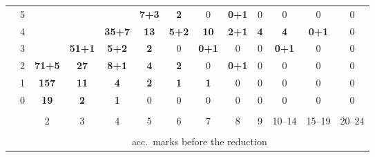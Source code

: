 \begin{tabular}{cc|ccccccccccc|}
 & 
5
 & 
\footnotesize{}
 & 
\footnotesize{}
 & 
\footnotesize{}
 & 
\footnotesize{\cellcolor{blue!8}\textbf{7+3}}
 & 
\footnotesize{\cellcolor{blue!5}\textbf{2}}
 & 
\footnotesize{0}
 & 
\footnotesize{\cellcolor{blue!5}\textbf{0+1}}
 & 
\footnotesize{0}
 & 
\footnotesize{0}
 & 
\footnotesize{0}
 & 
\footnotesize{0}
\\
 & 
4
 & 
\footnotesize{}
 & 
\footnotesize{}
 & 
\footnotesize{\cellcolor{blue!19}\textbf{35+7}}
 & 
\footnotesize{\cellcolor{blue!9}\textbf{13}}
 & 
\footnotesize{\cellcolor{blue!7}\textbf{5+2}}
 & 
\footnotesize{\cellcolor{blue!8}\textbf{10}}
 & 
\footnotesize{\cellcolor{blue!6}\textbf{2+1}}
 & 
\footnotesize{\cellcolor{blue!6}\textbf{4}}
 & 
\footnotesize{\cellcolor{blue!6}\textbf{4}}
 & 
\footnotesize{\cellcolor{blue!5}\textbf{0+1}}
 & 
\footnotesize{0}
\\
 & 
3
 & 
\footnotesize{}
 & 
\footnotesize{\cellcolor{blue!22}\textbf{51+1}}
 & 
\footnotesize{\cellcolor{blue!7}\textbf{5+2}}
 & 
\footnotesize{\cellcolor{blue!5}\textbf{2}}
 & 
\footnotesize{0}
 & 
\footnotesize{\cellcolor{blue!5}\textbf{0+1}}
 & 
\footnotesize{0}
 & 
\footnotesize{0}
 & 
\footnotesize{\cellcolor{blue!5}\textbf{0+1}}
 & 
\footnotesize{0}
 & 
\footnotesize{0}
\\
 & 
2
 & 
\footnotesize{\cellcolor{blue!30}\textbf{71+5}}
 & 
\footnotesize{\cellcolor{blue!14}\textbf{27}}
 & 
\footnotesize{\cellcolor{blue!8}\textbf{8+1}}
 & 
\footnotesize{\cellcolor{blue!6}\textbf{4}}
 & 
\footnotesize{\cellcolor{blue!5}\textbf{2}}
 & 
\footnotesize{0}
 & 
\footnotesize{\cellcolor{blue!5}\textbf{0+1}}
 & 
\footnotesize{0}
 & 
\footnotesize{0}
 & 
\footnotesize{0}
 & 
\footnotesize{0}
\\
 & 
1
 & 
\footnotesize{\cellcolor{blue!57}\textcolor{black!10}{\textbf{157}}}
 & 
\footnotesize{\cellcolor{blue!8}\textbf{11}}
 & 
\footnotesize{\cellcolor{blue!6}\textbf{4}}
 & 
\footnotesize{\cellcolor{blue!5}\textbf{2}}
 & 
\footnotesize{\cellcolor{blue!5}\textbf{1}}
 & 
\footnotesize{\cellcolor{blue!5}\textbf{1}}
 & 
\footnotesize{0}
 & 
\footnotesize{0}
 & 
\footnotesize{0}
 & 
\footnotesize{0}
 & 
\footnotesize{0}
\\
 & 
0
 & 
\footnotesize{\cellcolor{blue!11}\textbf{19}}
 & 
\footnotesize{\cellcolor{blue!5}\textbf{2}}
 & 
\footnotesize{\cellcolor{blue!5}\textbf{1}}
 & 
\footnotesize{0}
 & 
\footnotesize{0}
 & 
\footnotesize{0}
 & 
\footnotesize{0}
 & 
\footnotesize{0}
 & 
\footnotesize{0}
 & 
\footnotesize{0}
 & 
\footnotesize{0}
\\
\cline{3-13}\vspace{-10pt}\\
\multicolumn{2}{c}{}
 & 
2
 & 
3
 & 
4
 & 
5
 & 
6
 & 
7
 & 
8
 & 
9
 & 
10--14
 & 
15--19
 & 
\multicolumn{1}{c}{20--24}

\\
\vspace{-10pt}\\
\multicolumn{2}{c}{} & \multicolumn{11}{c}{acc.~marks before the reduction} \\
\end{tabular}

